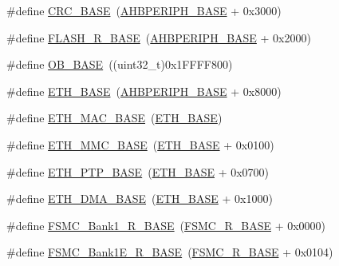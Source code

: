 \begin{DoxyCompactItemize}
\item 
\#define \hyperlink{group___peripheral__memory__map_ga656a447589e785594cbf2f45c835ad7e}{C\+R\+C\+\_\+\+B\+A\+SE}~(\hyperlink{group___peripheral__memory__map_ga92eb5d49730765d2abd0f5b09548f9f5}{A\+H\+B\+P\+E\+R\+I\+P\+H\+\_\+\+B\+A\+SE} + 0x3000)
\item 
\#define \hyperlink{group___peripheral__memory__map_ga8e21f4845015730c5731763169ec0e9b}{F\+L\+A\+S\+H\+\_\+\+R\+\_\+\+B\+A\+SE}~(\hyperlink{group___peripheral__memory__map_ga92eb5d49730765d2abd0f5b09548f9f5}{A\+H\+B\+P\+E\+R\+I\+P\+H\+\_\+\+B\+A\+SE} + 0x2000)
\item 
\#define \hyperlink{group___peripheral__memory__map_gab5b5fb155f9ee15dfb6d757da1adc926}{O\+B\+\_\+\+B\+A\+SE}~((uint32\+\_\+t)0x1\+F\+F\+F\+F800)
\item 
\#define \hyperlink{group___peripheral__memory__map_gad965a7b1106ece575ed3da10c45c65cc}{E\+T\+H\+\_\+\+B\+A\+SE}~(\hyperlink{group___peripheral__memory__map_ga92eb5d49730765d2abd0f5b09548f9f5}{A\+H\+B\+P\+E\+R\+I\+P\+H\+\_\+\+B\+A\+SE} + 0x8000)
\item 
\#define \hyperlink{group___peripheral__memory__map_ga3cf7005808feb61bff1fee01e50a711a}{E\+T\+H\+\_\+\+M\+A\+C\+\_\+\+B\+A\+SE}~(\hyperlink{group___peripheral__memory__map_gad965a7b1106ece575ed3da10c45c65cc}{E\+T\+H\+\_\+\+B\+A\+SE})
\item 
\#define \hyperlink{group___peripheral__memory__map_ga4946f2b3b03f7998343ac1778fbcf725}{E\+T\+H\+\_\+\+M\+M\+C\+\_\+\+B\+A\+SE}~(\hyperlink{group___peripheral__memory__map_gad965a7b1106ece575ed3da10c45c65cc}{E\+T\+H\+\_\+\+B\+A\+SE} + 0x0100)
\item 
\#define \hyperlink{group___peripheral__memory__map_gaa0f60b922aeb7275c785cbaa8f94ecf0}{E\+T\+H\+\_\+\+P\+T\+P\+\_\+\+B\+A\+SE}~(\hyperlink{group___peripheral__memory__map_gad965a7b1106ece575ed3da10c45c65cc}{E\+T\+H\+\_\+\+B\+A\+SE} + 0x0700)
\item 
\#define \hyperlink{group___peripheral__memory__map_gace2114e1b37c1ba88d60f3e831b67e93}{E\+T\+H\+\_\+\+D\+M\+A\+\_\+\+B\+A\+SE}~(\hyperlink{group___peripheral__memory__map_gad965a7b1106ece575ed3da10c45c65cc}{E\+T\+H\+\_\+\+B\+A\+SE} + 0x1000)
\item 
\#define \hyperlink{group___peripheral__memory__map_gad196fe6f5e4041b201d14f43508c06d2}{F\+S\+M\+C\+\_\+\+Bank1\+\_\+\+R\+\_\+\+B\+A\+SE}~(\hyperlink{group___peripheral__memory__map_gaddf0e199dccba83272b20c9fb4d3aaed}{F\+S\+M\+C\+\_\+\+R\+\_\+\+B\+A\+SE} + 0x0000)
\item 
\#define \hyperlink{group___peripheral__memory__map_gaea182589c84aee30b7f735474d8774e2}{F\+S\+M\+C\+\_\+\+Bank1\+E\+\_\+\+R\+\_\+\+B\+A\+SE}~(\hyperlink{group___peripheral__memory__map_gaddf0e199dccba83272b20c9fb4d3aaed}{F\+S\+M\+C\+\_\+\+R\+\_\+\+B\+A\+SE} + 0x0104)

\end{DoxyCompactItemize}
